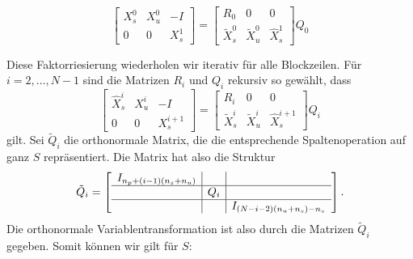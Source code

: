 $$\left[ \begin{array}{ccc}
X_s^0 &  X_u^0 & -I \\ 
0 & 0 & X_s^1
\end{array}\right]
= \left[ 
\begin{array}{ccc} 
R_0 & 0 & 0 \\
\tilde{X}^0_s & \tilde{X}^0_u & \hat{X}^1_s 
\end{array}\right]Q_0$$


Diese Faktorriesierung wiederholen wir iterativ für alle Blockzeilen. Für $i=2,\hdots,N-1$ sind die Matrizen $R_i$ und $Q_i$ rekursiv so gewählt, dass
$$\left[ \begin{array}{ccc}
\hat{X}_s^i &  X_u^i & -I \\ 
0 & 0 & X_s^{i+1}
\end{array}\right]
= \left[ 
\begin{array}{ccc} 
R_i & 0 & 0 \\
\tilde{X}^i_s & \tilde{X}^i_u & \hat{X}^{i+1}_s
\end{array}\right]Q_i$$
gilt. Sei $\tilde{Q}_i$ die orthonormale Matrix, die die entsprechende Spaltenoperation auf ganz $S$ repräsentiert. Die Matrix hat also die Struktur $$\tilde{Q}_i=\left[\begin{array}{c|c|c}
I_{n_p+(i-1)(n_s+n_u)} & & \\
\hline
& Q_i & \\
\hline
&&I_{(N-i-2)(n_u+n_s)-n_s}\\
\end{array}\right].$$
Die orthonormale Variablentransformation ist also durch die Matrizen $\tilde{Q}_i$ gegeben. Somit können wir gilt für $S$:

